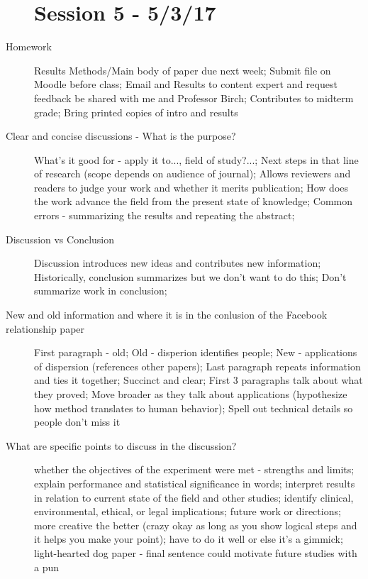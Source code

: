 \documentclass[10pt]{article}
\begin{document}
\begin{description}
\section{Session 5 - 5/3/17}
\item[Homework]
    Results Methods/Main body of paper due next week;
    Submit file on Moodle before class;
    Email and Results to content expert and request feedback be shared with me and Professor Birch;
    Contributes to midterm grade;
    Bring printed copies of intro and results
\item[Clear and concise discussions - What is the purpose?]
    What's it good for - apply it to..., field of study?...;
    Next steps in that line of research (scope depends on audience of journal);
    Allows reviewers and readers to judge your work and whether it merits publication;
    How does the work advance the field from the present state of knowledge;
    Common errors - summarizing the results and repeating the abstract;
\item[Discussion vs Conclusion]
    Discussion introduces new ideas and contributes new information;
    Historically, conclusion summarizes but we don't want to do this;
    Don't summarize work in conclusion;
\item[New and old information and where it is in the conlusion of the Facebook relationship paper]
    First paragraph - old;
    Old - disperion identifies people;
    New - applications of dispersion (references other papers);
    Last paragraph repeats information and ties it together;
    Succinct and clear;
    First 3 paragraphs talk about what they proved;
    Move broader as they talk about applications (hypothesize how method translates to human behavior);
    Spell out technical details so people don't miss it
\item[What are specific points to discuss in the discussion?]
    whether the objectives of the experiment were met - strengths and limits;
    explain performance and statistical significance in words;
    interpret results in relation to current state of the field and other studies;
    identify clinical, environmental, ethical, or legal implications;
    future work or directions;
    more creative the better (crazy okay as long as you show logical steps and it helps you make your point);
    have to do it well or else it's a gimmick;
    light-hearted dog paper - final sentence could motivate future studies with a pun
\end{description}
\end{document}
